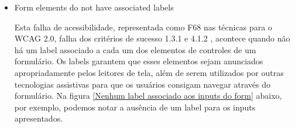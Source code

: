 \documentclass[
	12pt,				%
	openright,			%
	oneside,			%
	a4paper,			%
	chapter=TITLE,		%
	section=TITLE,		%
	subsection=TITLE,	%
	subsubsection=TITLE,%
	english,			%
	brazil				%
	]{abntex2}
\theoremstyle{definition}
\begin{document}
\begin{itemize}
\begin{figure}[!h]
\centering
\caption{Análise da acessibilidade dos headings na página inicial do AVA usando a extensão Web Developer}
\label{Análise da acessibilidade dos headings na página inicial do AVA usando a extensão Web Developer}
\end{figure}

\pagebreak

Na figura \ref{Análise da acessibilidade dos headings na página inicial do AVA usando a extensão Web Developer} acima, através da extensão Web Developer do Google Chrome, podemos visualizar que os elementos acusados pelo teste automatizado estão todos no nível h4, apesar dos headings anteriores estarem no nível h2. Para solucionar o problema, os headings devem ficar ordenados decrescente e sequencialmente, mudando os h4s da div com id “redius” para h3s e, assim, removendo o gap na sequência dos headings.

 \item Form elements do not have associated labels
   
Esta falha de acessibilidade, representada como F68 nas técnicas para o WCAG 2.0, falha dos critérios de sucesso 1.3.1 e 4.1.2 \cite{cooper2010techniques}, acontece quando não há um label associado a cada um dos elementos de controles de um formulário. Os labels garantem que esses elementos sejam anunciados apropriadamente pelos leitores de tela, além de serem utilizados por outras tecnologias assistivas para que os usuários consigam navegar através do formulário. Na figura \ref{Nenhum label associado aos inputs do form} abaixo, por exemplo, podemos notar a ausência de um label para os inputs apresentados.


\end{itemize}
\end{document}
